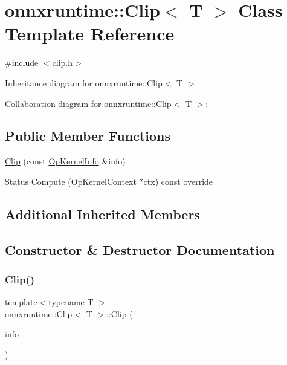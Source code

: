 \hypertarget{classonnxruntime_1_1Clip}{}\section{onnxruntime\+:\+:Clip$<$ T $>$ Class Template Reference}
\label{classonnxruntime_1_1Clip}


{\ttfamily \#include $<$clip.\+h$>$}



Inheritance diagram for onnxruntime\+:\+:Clip$<$ T $>$\+:


Collaboration diagram for onnxruntime\+:\+:Clip$<$ T $>$\+:
\subsection*{Public Member Functions}
\begin{DoxyCompactItemize}
\item 
\mbox{\hyperlink{classonnxruntime_1_1Clip_a320e571b61a354275676dd6251cf6698}{Clip}} (const \mbox{\hyperlink{classonnxruntime_1_1OpKernelInfo}{Op\+Kernel\+Info}} \&info)
\item 
\mbox{\hyperlink{classonnxruntime_1_1common_1_1Status}{Status}} \mbox{\hyperlink{classonnxruntime_1_1Clip_aafda6211d18e1c90ca35430f1af80bbf}{Compute}} (\mbox{\hyperlink{classonnxruntime_1_1OpKernelContext}{Op\+Kernel\+Context}} $\ast$ctx) const override
\end{DoxyCompactItemize}
\subsection*{Additional Inherited Members}


\subsection{Constructor \& Destructor Documentation}
\mbox{\label{classonnxruntime_1_1Clip_a320e571b61a354275676dd6251cf6698}} 
\subsubsection{\texorpdfstring{Clip()}{Clip()}}
{\footnotesize\ttfamily template$<$typename T $>$ \\
\mbox{\hyperlink{classonnxruntime_1_1Clip}{onnxruntime\+::\+Clip}}$<$ T $>$\+::\mbox{\hyperlink{classonnxruntime_1_1Clip}{Clip}} (\begin{DoxyParamCaption}\item[{const \mbox{\hyperlink{classonnxruntime_1_1OpKernelInfo}{Op\+Kernel\+Info}} \&}]{info }\end{DoxyParamCaption})\hspace{0.3cm}{\ttfamily [inline]}}



